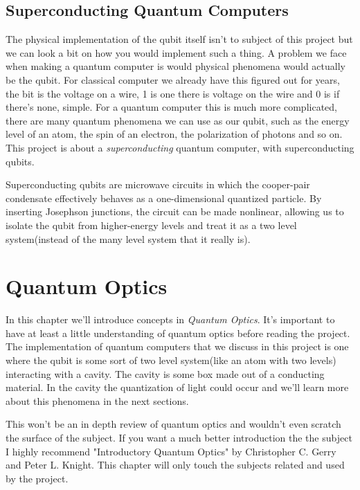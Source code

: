 \documentclass[english, a4paper, 12pt, twoside]{article}
\numberwithin{equation}{section} %
\begin{document}
\subsection{Superconducting Quantum Computers}  %
The physical implementation of the qubit itself isn't to subject of this project but we can look a bit on how you would implement such a thing. A problem we face when making a quantum computer is would physical phenomena would actually be the qubit. For classical computer we already have this figured out for years, the bit is the voltage on a wire, 1 is one there is voltage on the wire and 0 is if there's none, simple. For a quantum computer this is much more complicated, there are many quantum phenomena we can use as our qubit, such as the energy level of an atom, the spin of an electron, the polarization of photons and so on. This project is about a \textit{superconducting} quantum computer, with superconducting  qubits.

Superconducting qubits are microwave circuits in which the cooper-pair condensate effectively behaves as a one-dimensional quantized particle. By inserting Josephson junctions, the circuit can be made nonlinear, allowing us to isolate the qubit from higher-energy levels and treat it as a two  level system(instead of the many level system that it really is).


\newpage
\section{Quantum Optics}
In this chapter we'll introduce concepts in \textit{Quantum Optics}. It's important to have at least a little understanding of quantum optics before reading the project. The implementation of quantum computers that we discuss in this project is one where the qubit is some sort of two level system(like an atom with two levels) interacting with a cavity. The cavity is some box made out of a conducting material. In the cavity the quantization of light could occur and we'll learn more about this phenomena in the next sections.

This won't be an in depth review of quantum optics and wouldn't even scratch the surface of the subject. If you want a much better introduction the the subject I highly recommend "Introductory Quantum Optics" by Christopher C. Gerry and Peter L. Knight. This chapter will only touch the subjects related and used by the project.
\end{document}
